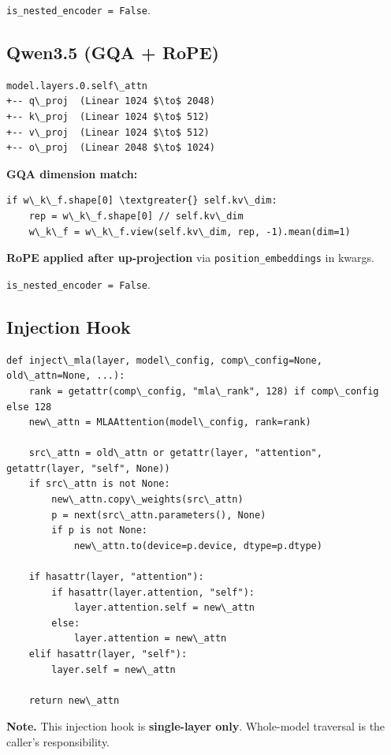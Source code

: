 \texttt{is\_nested\_encoder = False}.

\subsection{Qwen3.5 (GQA + RoPE)}

\begin{lstlisting}
model.layers.0.self\_attn
+-- q\_proj  (Linear 1024 $\to$ 2048)
+-- k\_proj  (Linear 1024 $\to$ 512)
+-- v\_proj  (Linear 1024 $\to$ 512)
+-- o\_proj  (Linear 2048 $\to$ 1024)
\end{lstlisting}

\textbf{GQA dimension match:}
\begin{lstlisting}
if w\_k\_f.shape[0] \textgreater{} self.kv\_dim:
    rep = w\_k\_f.shape[0] // self.kv\_dim
    w\_k\_f = w\_k\_f.view(self.kv\_dim, rep, -1).mean(dim=1)
\end{lstlisting}

\textbf{RoPE applied after up-projection} via \texttt{position\_embeddings} in kwargs.

\texttt{is\_nested\_encoder = False}.

\subsection{Injection Hook}

\begin{lstlisting}
def inject\_mla(layer, model\_config, comp\_config=None, old\_attn=None, ...):
    rank = getattr(comp\_config, "mla\_rank", 128) if comp\_config else 128
    new\_attn = MLAAttention(model\_config, rank=rank)
    
    src\_attn = old\_attn or getattr(layer, "attention", getattr(layer, "self", None))
    if src\_attn is not None:
        new\_attn.copy\_weights(src\_attn)
        p = next(src\_attn.parameters(), None)
        if p is not None:
            new\_attn.to(device=p.device, dtype=p.dtype)
    
    if hasattr(layer, "attention"):
        if hasattr(layer.attention, "self"):
            layer.attention.self = new\_attn
        else:
            layer.attention = new\_attn
    elif hasattr(layer, "self"):
        layer.self = new\_attn
    
    return new\_attn
\end{lstlisting}

\textbf{Note.} This injection hook is \textbf{single-layer only}. Whole-model traversal 
is the caller's responsibility.

